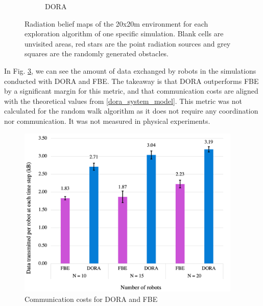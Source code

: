 \begin{figure}
\begin{subfigure}{0.45\textwidth}
        \caption{\ac{DORA}}
        \label{results:beliefdora}
    \end{subfigure}
    \caption[DORA radiation belief maps]{Radiation belief maps of the 20x20m environment for each exploration algorithm of one specific simulation. Blank cells are unvisited areas, red stars are the point radiation sources and grey squares are the randomly generated obstacles.}
    \label{results:belief}
\end{figure}

In Fig. \ref{results:communicationCosts}, we can see the amount of data exchanged by robots in the simulations conducted with \ac{DORA} and \ac{FBE}. The takeaway is that \ac{DORA} outperforms \ac{FBE} by a significant margin for this metric, and that communication costs are aligned with the theoretical values from \ref{dora_system_model}. This metric was not calculated for the random walk algorithm as it does not require any coordination nor communication. It was not measured in physical experiments.

\begin{figure}[htbp]
    \centering
    \includegraphics[width=0.95\textwidth]{figures/dora_explorer/communication.png}
    \caption[DORA communication costs]{Communication costs for \ac{DORA} and \ac{FBE}}
    \label{results:communicationCosts}
\end{figure}

\FloatBarrier

